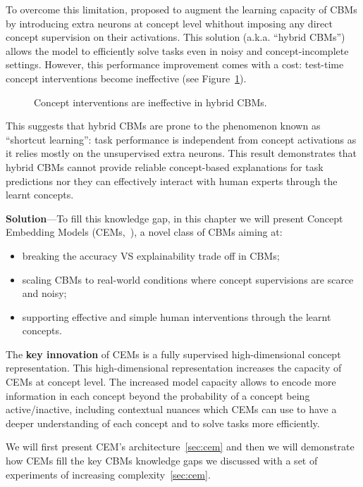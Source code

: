 To overcome this limitation, \citet{mahinpei2021promises} proposed to augment the learning capacity of CBMs by introducing extra neurons at concept level whithout imposing any direct concept supervision on their activations. This solution (a.k.a. ``hybrid CBMs'') allows the model to efficiently solve tasks even in noisy and concept-incomplete settings. However, this performance improvement comes with a cost: test-time concept interventions become ineffective (see Figure~\ref{fig:hybrid_interventions}).
\begin{figure}[H]
\caption{Concept interventions are ineffective in hybrid CBMs.}
\label{fig:hybrid_interventions}
\end{figure}
This suggests that hybrid CBMs are prone to the phenomenon known as ``shortcut learning'': task performance is independent from concept activations as it relies mostly on the unsupervised extra neurons. This result demonstrates that hybrid CBMs cannot provide reliable concept-based explanations for task predictions nor they can effectively interact with human experts through the learnt concepts.

\textbf{Solution}---To fill this knowledge gap, in this chapter we will present Concept Embedding Models (CEMs,~\citep{zarlenga2022concept}), a novel class of CBMs aiming at:
\begin{itemize}
	\item breaking the accuracy VS explainability trade off in CBMs;
	\item scaling CBMs to real-world conditions where concept supervisions are scarce and noisy;
	\item supporting effective and simple human interventions through the learnt concepts.
\end{itemize}
The \textbf{key innovation} of CEMs is a fully supervised high-dimensional concept representation. This high-dimensional representation increases the capacity of CEMs at concept level. The increased model capacity allows to encode more information in each concept beyond the probability of a concept being active/inactive, including contextual nuances which CEMs can use to have a deeper understanding of each concept and to solve tasks more efficiently.

We will first present CEM's architecture~\ref{sec:cem} and then we will demonstrate how CEMs fill the key CBMs knowledge gaps we discussed with a set of experiments of increasing complexity~\ref{sec:cem}.

%
%


